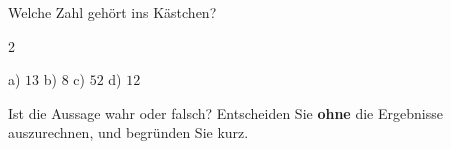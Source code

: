 \documentclass[11pt]{exam}
\begin{document}

\begin{questions}

\question Welche Zahl gehört ins Kästchen?
\begin{multicols}{2}
\end{multicols}
\begin{solution}
  a) $13$ \quad b) $8$ \quad c) $52$ \quad d) $12$
\end{solution}
\raum{2cm}

\question Ist die Aussage wahr oder falsch? Entscheiden Sie \textbf{ohne}
die Ergebnisse auszurechnen, und begründen Sie kurz.
\end{questions}
\end{document}
